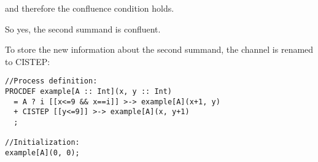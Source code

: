 and therefore the confluence condition holds.

So yes, the second summand is confluent.

To store the new information about the second summand, the channel is renamed to CISTEP:

\begin{lstlisting}
//Process definition:
PROCDEF example[A :: Int](x, y :: Int)
  = A ? i [[x<=9 && x==i]] >-> example[A](x+1, y)
  + CISTEP [[y<=9]] >-> example[A](x, y+1)
  ;

//Initialization:
example[A](0, 0);
\end{lstlisting}

